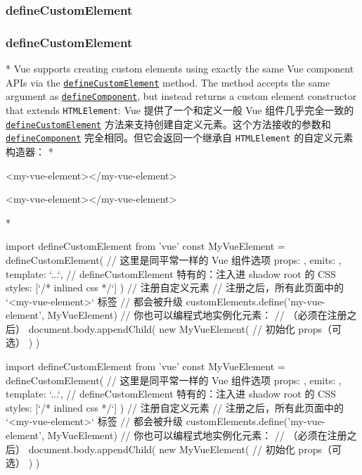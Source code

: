 \begin{paracol}{2}
\subsubsection{defineCustomElement}
\switchcolumn
\subsubsection{defineCustomElement}
\switchcolumn[0]*%
Vue supports creating custom elements using exactly the same Vue
component APIs via the
\href{https://vuejs.org/api/general.html\#definecustomelement}{\texttt{defineCustomElement}}
method. The method accepts the same argument as
\href{https://vuejs.org/api/general.html\#definecomponent}{\texttt{defineComponent}},
but instead returns a custom element constructor that extends
\texttt{HTMLElement}:
\switchcolumn
Vue 提供了一个和定义一般 Vue 组件几乎完全一致的
\href{https://cn.vuejs.org/api/general.html\#definecustomelement}{\texttt{defineCustomElement}}
方法来支持创建自定义元素。这个方法接收的参数和
\href{https://cn.vuejs.org/api/general.html\#definecomponent}{\texttt{defineComponent}}
完全相同。但它会返回一个继承自 \texttt{HTMLElement} 的自定义元素构造器：
\switchcolumn[0]*%
\begin{codeHtml}
<my-vue-element></my-vue-element>
\end{codeHtml}
\switchcolumn
\begin{codeHtml}
<my-vue-element></my-vue-element>
\end{codeHtml}
\switchcolumn[0]*%
\begin{codeJs}
import { defineCustomElement } from 'vue'
const MyVueElement = defineCustomElement({
  // 这里是同平常一样的 Vue 组件选项
  props: {},
  emits: {},
  template: `...`,
  // defineCustomElement 特有的：注入进 shadow root 的 CSS
  styles: [`/* inlined css */`]
})
// 注册自定义元素
// 注册之后，所有此页面中的 `<my-vue-element>` 标签
// 都会被升级
customElements.define('my-vue-element', MyVueElement)
// 你也可以编程式地实例化元素：
// （必须在注册之后）
document.body.appendChild(
  new MyVueElement({
    // 初始化 props（可选）
  })
)
\end{codeJs}
\switchcolumn
\begin{codeJs}
import { defineCustomElement } from 'vue'
const MyVueElement = defineCustomElement({
  // 这里是同平常一样的 Vue 组件选项
  props: {},
  emits: {},
  template: `...`,
  // defineCustomElement 特有的：注入进 shadow root 的 CSS
  styles: [`/* inlined css */`]
})
// 注册自定义元素
// 注册之后，所有此页面中的 `<my-vue-element>` 标签
// 都会被升级
customElements.define('my-vue-element', MyVueElement)
// 你也可以编程式地实例化元素：
// （必须在注册之后）
document.body.appendChild(
  new MyVueElement({
    // 初始化 props（可选）
  })
)
\end{codeJs}
\end{paracol}

